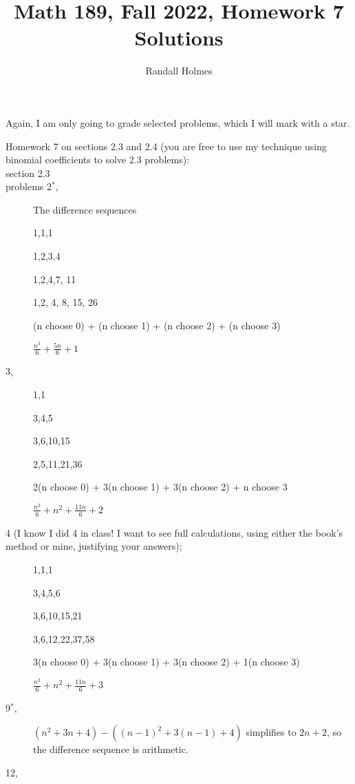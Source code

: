 \documentclass[12pt]{article}
\title{Math 189, Fall 2022, Homework 7 Solutions}
\author{Randall Holmes}
\begin{document}
\maketitle

Again, I am only going to grade selected problems, which I will mark with a star.

\begin{description}
\item[Homework 7 on sections 2.3 and 2.4 (you are free to use my technique using binomial coefficients to solve 2.3 problems):]

\item[ section 2.3]

\item[ problems 2$^*$,]  The difference sequences

1,1,1

1,2,3,4

 1,2,4,7, 11
  
1,2, 4, 8, 15, 26

(n choose 0) + (n choose 1) + (n choose 2) + (n choose 3)

$\frac{n^3}6 +\frac{5n}6 +1$

\item[3,]

1,1

3,4,5

3,6,10,15

2,5,11,21,36

2(n choose 0) + 3(n choose 1) + 3(n choose 2) + n choose 3

$\frac{n^3}6 +n^2 +\frac{11n}6 +2$

\item[4 (I know I did 4 in class! I want to see full calculations, using either the book's method or mine, justifying your answers);]

1,1,1

3,4,5,6

3,6,10,15,21

3,6,12,22,37,58

3(n choose 0) + 3(n choose 1) + 3(n choose 2) + 1(n choose 3)

$\frac{n^3}6 + n^2 + \frac{11n}6 +3$

\item[ 9$^*$,]

$(n^2+3n+4) - ((n-1)^2 + 3(n-1) +4)$ simplifies to $2n+2$, so the difference sequence is arithmetic.

\item[ 12,]


\end{description}
\end{document}

